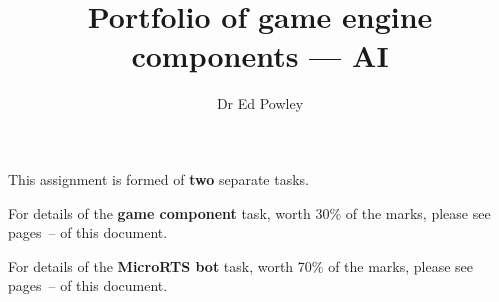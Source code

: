 \documentclass{../../fal_assignment}
\title{Portfolio of game engine components --- AI}
\author{Dr Ed Powley}
\begin{document}
\maketitle

This assignment is formed of \textbf{two} separate tasks.

For details of the \textbf{game component} task, worth 30\% of the marks, please see pages~\pageref{p:part1-start}--\pageref{p:part1-end} of this document.

For details of the \textbf{MicroRTS bot} task, worth 70\% of the marks, please see pages~\pageref{p:part2-start}--\pageref{p:part2-end} of this document.

\clearpage

\clearpage

\end{document}

